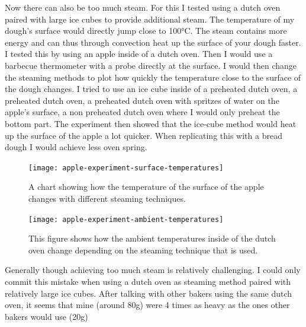 Now there can also be too much steam. For this I tested using a dutch oven paired with large ice
cubes to provide additional steam. The temperature of my dough's surface would directly
jump close to 100°C. The steam contains more energy and can thus through convection
heat up the surface of your dough faster. I tested this by using an apple inside of
a dutch oven. Then I would use a barbecue thermometer with a probe directly at the surface.
I would then change the steaming methods to plot how quickly the temperature
close to the surface of the dough changes. I tried to use an ice cube inside of a preheated
dutch oven, a preheated dutch oven, a preheated dutch oven with spritzes
of water on the apple's surface, a non preheated dutch oven where I would only preheat
the bottom part. The experiment then showed that the ice-cube method would heat up
the surface of the apple a lot quicker. When replicating this with a bread dough
I would achieve less oven spring.

\begin{figure}[h]
  \texttt{[image: apple-experiment-surface-temperatures]}
  \caption{A chart showing how the temperature of the surface
  of the apple changes with different steaming techniques.}
  \label{apple-experiment-surface-temperatures}
\end{figure}

\begin{figure}[h]
  \texttt{[image: apple-experiment-ambient-temperatures]}
  \caption{This figure shows how the ambient temperatures inside of the
  dutch oven change depending on the steaming technique that is used.}
  \label{apple-experiment-ambient-temperatures}
\end{figure}

Generally though achieving too much steam is relatively challenging. I could only
commit this mistake when using a dutch oven as steaming method paired with relatively
large ice cubes. After talking with other bakers using the same dutch oven, it seems
that mine (around 80g) were 4 times as heavy as the ones other bakers would use (20g)
